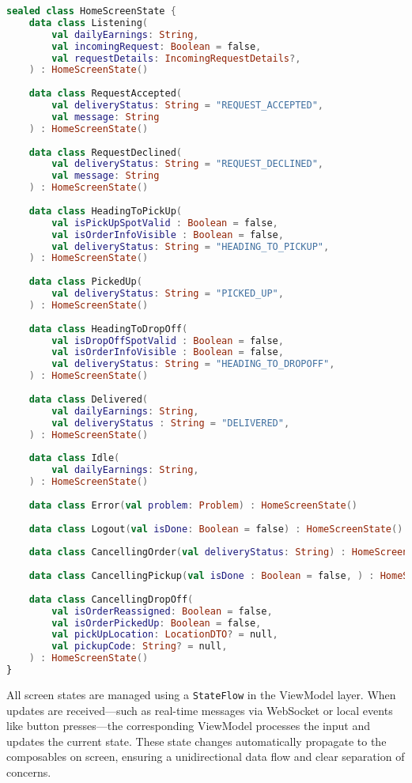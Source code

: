 \begin{lstlisting}[language=Kotlin, caption={HomeScreenState sealed class}]
sealed class HomeScreenState {
    data class Listening(
        val dailyEarnings: String,
        val incomingRequest: Boolean = false,
        val requestDetails: IncomingRequestDetails?,
    ) : HomeScreenState()
    
    data class RequestAccepted(
        val deliveryStatus: String = "REQUEST_ACCEPTED",
        val message: String
    ) : HomeScreenState()
    
    data class RequestDeclined(
        val deliveryStatus: String = "REQUEST_DECLINED",
        val message: String
    ) : HomeScreenState()
    
    data class HeadingToPickUp(
        val isPickUpSpotValid : Boolean = false,
        val isOrderInfoVisible : Boolean = false,
        val deliveryStatus: String = "HEADING_TO_PICKUP",
    ) : HomeScreenState()
    
    data class PickedUp(
        val deliveryStatus: String = "PICKED_UP",
    ) : HomeScreenState()
    
    data class HeadingToDropOff(
        val isDropOffSpotValid : Boolean = false,
        val isOrderInfoVisible : Boolean = false,
        val deliveryStatus: String = "HEADING_TO_DROPOFF",
    ) : HomeScreenState()
    
    data class Delivered(
        val dailyEarnings: String,
        val deliveryStatus : String = "DELIVERED",
    ) : HomeScreenState()
    
    data class Idle(
        val dailyEarnings: String,
    ) : HomeScreenState()
    
    data class Error(val problem: Problem) : HomeScreenState()
    
    data class Logout(val isDone: Boolean = false) : HomeScreenState()
    
    data class CancellingOrder(val deliveryStatus: String) : HomeScreenState()
    
    data class CancellingPickup(val isDone : Boolean = false, ) : HomeScreenState()
    
    data class CancellingDropOff(
        val isOrderReassigned: Boolean = false,
        val isOrderPickedUp: Boolean = false,
        val pickUpLocation: LocationDTO? = null,
        val pickupCode: String? = null,
    ) : HomeScreenState()
}
\end{lstlisting}

All screen states are managed using a \texttt{StateFlow} in the ViewModel layer. When updates are received—such as real-time messages via WebSocket or local events like button presses—the corresponding ViewModel processes the input and updates the current state. These state changes automatically propagate to the composables on screen, ensuring a unidirectional data flow and clear separation of concerns.



